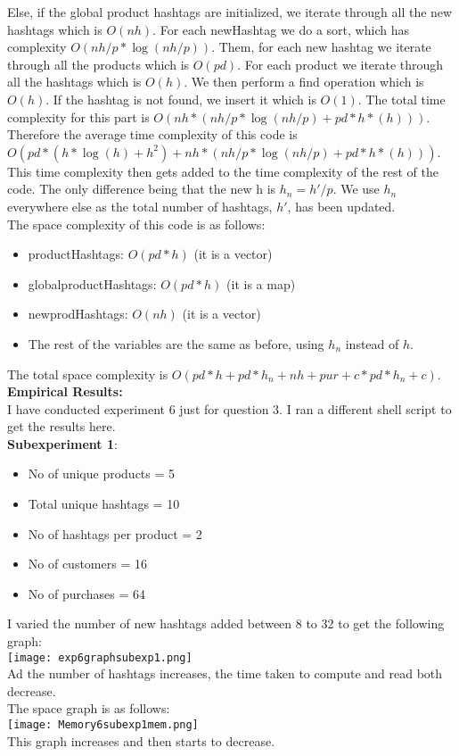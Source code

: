 \documentclass[12pt]{article}
\begin{document}
Else, if the global product hashtags are initialized, we iterate through all the new hashtags which is $O(nh)$. For each newHashtag we do a sort, which has complexity $O(nh/p* \log(nh/p))$. Them, for each new hashtag we iterate through all the products which is $O(pd)$. For each product we iterate through all the hashtags which is $O(h)$. We then perform a find operation which is $O(h)$. If the hashtag is not found, we insert it which is $O(1)$. The total time complexity for this part is $O(nh*(nh/p * \log(nh/p) + pd*h*(h)))$.\\
Therefore the average time complexity of this code is $O(pd*(h*\log(h) + h^2) + nh*(nh/p * \log(nh/p) + pd*h*(h)))$.\\
This time complexity then gets added to the time complexity of the rest of the code. The only difference being that the new h is $h_n = h'/p$. We use $h_n$ everywhere else as the total number of hashtags, $h'$, has been updated.\\

The space complexity of this code is as follows:
\begin{itemize}
    \item productHashtags: $O(pd*h)$ (it is a vector)
    \item globalproductHashtags: $O(pd*h)$ (it is a map)
    \item newprodHashtags: $O(nh)$ (it is a vector)
    \item The rest of the variables are the same as before, using $h_n$ instead of $h$.
\end{itemize}
The total space complexity is $O(pd*h + pd*h_n + nh + pur + c*pd*h_n + c)$.\\

\textbf{Empirical Results:}\\
I have conducted experiment 6 just for question 3. I ran a different shell script to get the results here.\\
\textbf{Subexperiment 1}:\\
\begin{itemize}
    \item No of unique products = 5
    \item Total unique hashtags = 10
    \item No of hashtags per product = 2
    \item No of customers = 16
    \item No of purchases = 64
\end{itemize}
I varied the number of new hashtags added between 8 to 32 to get the following graph:\\
\texttt{[image: exp6graphsubexp1.png]}\\
Ad the number of hashtags increases, the time taken to compute and read both decrease.\\
The space graph is as follows:\\
\texttt{[image: Memory6subexp1mem.png]}\\
This graph increases and then starts to decrease.\\
\end{document}
